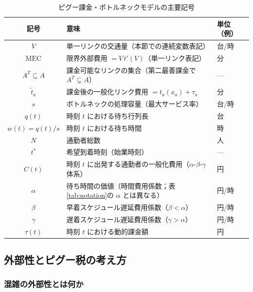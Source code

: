 \begin{table}[hbtp]
  \centering
  \caption{ピグー課金・ボトルネックモデルの主要記号}
  \label{tab:ch8-notation}
  \begin{tabular}{cll}
    \toprule
    記号 & 意味 & 単位（例） \\
    \midrule
    $V$                & 単一リンクの交通量（本節での連続変数表記） & 台/時 \\
    $\mathrm{MEC}$     & 限界外部費用 $= V\,t'(V)$（単一リンク表記） & 分 \\
    $A^T \subseteq A$  & 課金可能なリンクの集合（第二最善課金で $A^T \subsetneq A$） & — \\
    $\tilde{t}_a$      & 課金後の一般化リンク費用 $= t_a(x_a) + \tau_a$ & 分 \\
    $s$                & ボトルネックの処理容量（最大サービス率） & 台/時 \\
    $q(t)$             & 時刻 $t$ における待ち行列長 & 台 \\
    $w(t) = q(t)/s$    & 時刻 $t$ における待ち時間 & 時 \\
    $N$                & 通勤者総数 & 人 \\
    $t^*$              & 希望到着時刻（始業時刻） & — \\
    $C(t)$             & 時刻 $t$ に出発する通勤者の一般化費用（$\alpha$-$\beta$-$\gamma$ 体系） & 円 \\
    $\alpha$           & 待ち時間の価値（時間費用係数；表\ref{tab:notation}の $\alpha$ とは異なる） & 円/時 \\
    $\beta$            & 早着スケジュール遅延費用係数（$\beta<\alpha$） & 円/時 \\
    $\gamma$           & 遅着スケジュール遅延費用係数（$\gamma>\alpha$） & 円/時 \\
    $\tau(t)$          & 時刻 $t$ における動的課金額 & 円 \\
    \bottomrule
  \end{tabular}
\end{table}

\subsection{外部性とピグー税の考え方}
\label{subsec:pigou-externality}

\subsubsection*{混雑の外部性とは何か}

